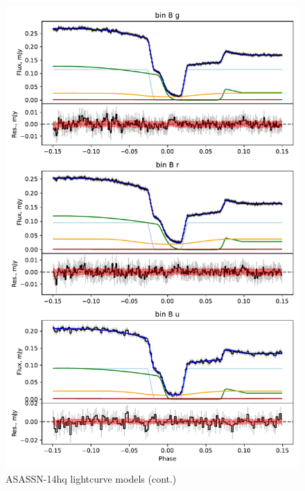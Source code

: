 \begin{figure}
    \centering
    \includegraphics[width=\textwidth]{figures/results/ASASSN-14hq/ASASSN-14hq_2.pdf}
    \caption{ASASSN-14hq lightcurve models (cont.)}
    \label{fig:ASASSN-14hq all lightcurves cont}
\end{figure}
